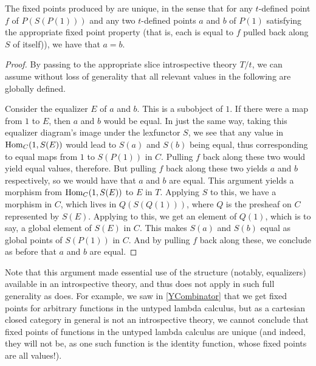\begin{theorem}\label{UniqueFixedPoints}
The fixed points produced by  are unique, in the sense that for any $t$-defined point $f$ of $P(S(P(1)))$ and any two $t$-defined points $a$ and $b$ of $P(1)$ satisfying the appropriate fixed point property (that is, each is equal to $f$ pulled back along $S$ of itself)), we have that $a = b$.
\end{theorem}
\begin{proof}
By passing to the appropriate slice introspective theory $T/t$, we can assume without loss of generality that all relevant values in the following are globally defined. 

Consider the equalizer $E$ of $a$ and $b$. This is a subobject of $1$. If there were a map from $1$ to $E$, then $a$ and $b$ would be equal. In just the same way, taking this equalizer diagram's image under the lexfunctor $S$, we see that any value in $\operatorname{Hom}_C(1, S(E))$ would lead to $S(a)$ and $S(b)$ being equal, thus corresponding to equal maps from $1$ to $S(P(1))$ in $C$. Pulling $f$ back along these two would yield equal values, therefore. But pulling $f$ back along these two yields $a$ and $b$ respectively, so we would have that $a$ and $b$ are equal. This argument yields a morphism from $\operatorname{Hom}_C(1, S(E))$ to $E$ in $T$. Applying $S$ to this, we have a morphism in $C$, which lives in $Q(S(Q(1)))$, where $Q$ is the presheaf on $C$ represented by $S(E)$. Applying  to this, we get an element of $Q(1)$, which is to say, a global element of $S(E)$ in $C$. This makes $S(a)$ and $S(b)$ equal as global points of $S(P(1))$ in $C$. And by pulling $f$ back along these, we conclude as before that $a$ and $b$ are equal. 
\end{proof}

\begin{observation}
Note that this argument made essential use of the structure (notably, equalizers) available in an introspective theory, and thus does not apply in such full generality as  does. For example, we saw in \cref{YCombinator} that we get fixed points for arbitrary functions in the untyped lambda calculus, but as a cartesian closed category in general is not an introspective theory, we cannot conclude that fixed points of functions in the untyped lambda calculus are unique (and indeed, they will not be, as one such function is the identity function, whose fixed points are all values!).
\end{observation}


